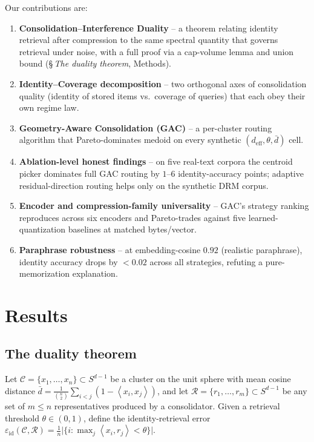 \documentclass[11pt]{article}
\theoremstyle{definition}
\theoremstyle{remark}
\newcommand{\deff}{d_{\mathrm{eff}}}
\newcommand{\dbar}{\bar{d}}
\newcommand{\clusterset}{\mathcal{C}}
\newcommand{\reps}{\mathcal{R}}
\newcommand{\inner}[2]{\left\langle#1,#2\right\rangle}
\newcommand{\eps}{\varepsilon}
\begin{document}
Our contributions are:
\begin{enumerate}
    \item[\textbf{(C1)}] \textbf{Consolidation--Interference Duality} --
    a theorem relating identity retrieval after compression to the same
    spectral quantity that governs retrieval under noise, with a full
    proof via a cap-volume lemma and union bound
    (\S\,\textit{The duality theorem}, Methods).
    \item[\textbf{(C2)}] \textbf{Identity--Coverage decomposition} --
    two orthogonal axes of consolidation quality (identity of stored items
    vs.\ coverage of queries) that each obey their own regime law.
    \item[\textbf{(C3)}] \textbf{Geometry-Aware Consolidation (GAC)} --
    a per-cluster routing algorithm that Pareto-dominates medoid on
    every synthetic $(\deff, \theta, \dbar)$ cell.
    \item[\textbf{(C4)}] \textbf{Ablation-level honest findings} --
    on five real-text corpora the centroid picker dominates full GAC
    routing by $1$--$6$ identity-accuracy points; adaptive residual-direction
    routing helps only on the synthetic DRM corpus.
    \item[\textbf{(C5)}] \textbf{Encoder and compression-family universality} --
    GAC's strategy ranking reproduces across six encoders and Pareto-trades
    against five learned-quantization baselines at matched bytes/vector.
    \item[\textbf{(C6)}] \textbf{Paraphrase robustness} -- at embedding-cosine
    $0.92$ (realistic paraphrase), identity accuracy drops by $<0.02$ across
    all strategies, refuting a pure-memorization explanation.
\end{enumerate}

\section*{Results}

\subsection*{The duality theorem}
Let $\clusterset = \{x_1, \ldots, x_n\} \subset S^{d-1}$ be a cluster on the
unit sphere with mean cosine distance
$\dbar = \tfrac{1}{\binom{n}{2}}\sum_{i<j}(1 - \inner{x_i}{x_j})$, and let
$\reps = \{r_1, \ldots, r_m\} \subset S^{d-1}$ be any set of $m \leq n$
representatives produced by a consolidator. Given a retrieval threshold
$\theta \in (0,1)$, define the identity-retrieval error
$\eps_{\mathrm{id}}(\clusterset, \reps) = \tfrac{1}{n}\bigl|\{i :
\max_j \inner{x_i}{r_j} < \theta\}\bigr|$.
\end{document}
